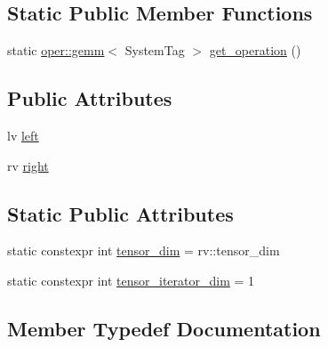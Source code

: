 \subsection*{Static Public Member Functions}
\begin{DoxyCompactItemize}
\item 
static \hyperlink{structbc_1_1oper_1_1gemm}{oper\+::gemm}$<$ System\+Tag $>$ \hyperlink{structbc_1_1tensors_1_1exprs_1_1Bin__Op_3_01oper_1_1gemm_3_01SystemTag_01_4_00_01lv_00_01rv_01_4_a96432eb485b1d23f90638920f296ae1b}{get\+\_\+operation} ()
\end{DoxyCompactItemize}
\subsection*{Public Attributes}
\begin{DoxyCompactItemize}
\item 
lv \hyperlink{structbc_1_1tensors_1_1exprs_1_1Bin__Op_3_01oper_1_1gemm_3_01SystemTag_01_4_00_01lv_00_01rv_01_4_ae9d1e883b267b8e0c1d927ca6b26f8c6}{left}
\item 
rv \hyperlink{structbc_1_1tensors_1_1exprs_1_1Bin__Op_3_01oper_1_1gemm_3_01SystemTag_01_4_00_01lv_00_01rv_01_4_a20739a433b1fe788085657c8f35259e7}{right}
\end{DoxyCompactItemize}
\subsection*{Static Public Attributes}
\begin{DoxyCompactItemize}
\item 
static constexpr int \hyperlink{structbc_1_1tensors_1_1exprs_1_1Bin__Op_3_01oper_1_1gemm_3_01SystemTag_01_4_00_01lv_00_01rv_01_4_ac3279ba20c5ec0f6ce97feea4c2d9ac8}{tensor\+\_\+dim} = rv\+::tensor\+\_\+dim
\item 
static constexpr int \hyperlink{structbc_1_1tensors_1_1exprs_1_1Bin__Op_3_01oper_1_1gemm_3_01SystemTag_01_4_00_01lv_00_01rv_01_4_a11116818fa08dda822689fd64bb2b5c9}{tensor\+\_\+iterator\+\_\+dim} = 1
\end{DoxyCompactItemize}


\subsection{Member Typedef Documentation}
\mbox{\label{structbc_1_1tensors_1_1exprs_1_1Bin__Op_3_01oper_1_1gemm_3_01SystemTag_01_4_00_01lv_00_01rv_01_4_a5779bf3375f157aac9c1493c560cfcd0}} 

